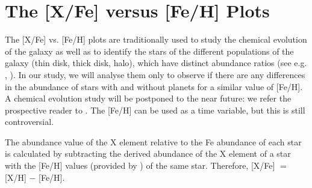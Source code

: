 \documentclass[dvips,12pt,a4paper]{report}
\begin{document}
{{\section {The [X/Fe] versus [Fe/H] Plots}
\label{xfefeh}
The [X/Fe] vs. [Fe/H] plots are traditionally used to study the chemical evolution of the galaxy as well as to identify the stars of the different populations of the galaxy (thin disk, thick disk, halo), which have distinct abundance ratios (see e.g. \citeauthor{Bensby-2003} \citeyear{Bensby-2003}, \citeauthor{Fuhrmann-2004} \citeyear{Fuhrmann-2004}). In our study, we will analyse them only to observe if there are any differences in the abundance of stars with and without planets for a similar value of [Fe/H]. A chemical evolution study will be postponed to the near future: we refer the prospective reader to \citet{McWilliam-1997}. The [Fe/H] can be used as a time variable, but this is still controversial.

The abundance value of the X element relative to the Fe abundance of each star is calculated by subtracting the derived abundance of the X element of a star with the [Fe/H] values (provided by \citeauthor{Sousa-2008} \citeyear{Sousa-2008}) of the same star. Therefore, [X/Fe] $=$ [X/H] $-$ [Fe/H].

}}
\end{document}
